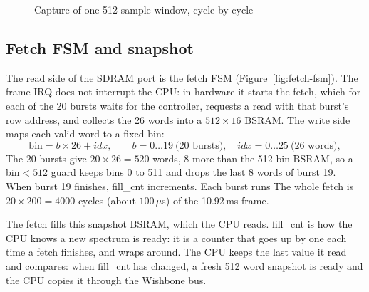 \documentclass[a4paper,10pt]{article}
\begin{document}
\begin{figure}[H]
{%
}
\caption{Capture of one 512 sample window, cycle by cycle}
\label{fig:pipeline}
\end{figure}

\subsection{Fetch FSM and snapshot}
\label{sec:fetch}

The read side of the SDRAM port is the fetch FSM
(Figure~\ref{fig:fetch-fsm}). The frame IRQ does not interrupt the CPU: in hardware
it starts the fetch, which for each of the 20 bursts waits for the controller,
requests a read with that burst's row address, and collects the 26 words into a
$512\times16$ BSRAM. The write side maps each valid word to a fixed bin:
\[
\text{bin} = b\times26 + idx, \qquad
b=0\ldots19\ \text{(20 bursts)}, \quad
idx=0\ldots25\ \text{(26 words)},
\]
The 20 bursts give $20\times26=520$ words, 8 more than
the 512 bin BSRAM, so a bin$<512$ guard keeps bins 0 to 511 and drops the last 8
words of burst 19. When burst 19 finishes, fill\_cnt increments. Each burst runs
The whole fetch is $20\times200=4000$ cycles (about
$100\,\mu$s) of the 10.92\,ms frame.

The fetch fills this snapshot BSRAM, which the CPU reads.
fill\_cnt is how the CPU knows a new spectrum is ready: it is a counter that
goes up by one each time a fetch finishes, and wraps around.
The CPU keeps the last value it read and
compares: when fill\_cnt has changed, a fresh 512 word snapshot is ready and
the CPU copies it through the Wishbone bus.
\end{document}
